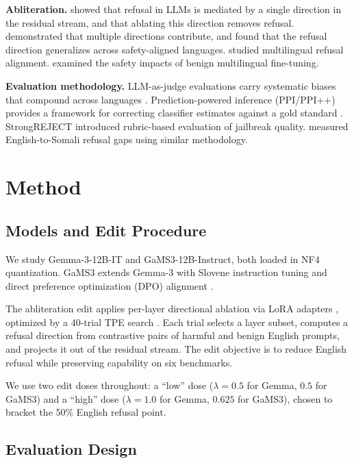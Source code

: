 \documentclass[11pt,letterpaper]{article}
\begin{document}
\textbf{Abliteration.} \citet{Arditi2024} showed that refusal in LLMs is mediated by a single direction in the residual stream, and that ablating this direction removes refusal. \citet{Joad2026} demonstrated that multiple directions contribute, and \citet{Wang2025} found that the refusal direction generalizes across safety-aligned languages. \citet{Krasnodebska2026} studied multilingual refusal alignment. \citet{Hawkins2026} examined the safety impacts of benign multilingual fine-tuning.

\textbf{Evaluation methodology.} LLM-as-judge evaluations carry systematic biases that compound across languages \citep{Lee2025, Shi2024}. Prediction-powered inference (PPI/PPI++) provides a framework for correcting classifier estimates against a gold standard \citep{Angelopoulos2023, Angelopoulos2023a}. StrongREJECT \citep{Souly2024} introduced rubric-based evaluation of jailbreak quality. \citet{Dahir2026} measured English-to-Somali refusal gaps using similar methodology.

\section{Method}

\subsection{Models and Edit Procedure}

We study Gemma-3-12B-IT and GaMS3-12B-Instruct, both loaded in NF4 quantization. GaMS3 extends Gemma-3 with Slovene instruction tuning and direct preference optimization (DPO) alignment \citep{Vres2026}.

The abliteration edit applies per-layer directional ablation via LoRA adapters \citep{Hu2021}, optimized by a 40-trial TPE search \citep{Akiba2019}. Each trial selects a layer subset, computes a refusal direction from contrastive pairs of harmful and benign English prompts, and projects it out of the residual stream. The edit objective is to reduce English refusal while preserving capability on six benchmarks.

We use two edit doses throughout: a ``low'' dose ($\lambda = 0.5$ for Gemma, $0.5$ for GaMS3) and a ``high'' dose ($\lambda = 1.0$ for Gemma, $0.625$ for GaMS3), chosen to bracket the 50\% English refusal point.

\subsection{Evaluation Design}
\end{document}
